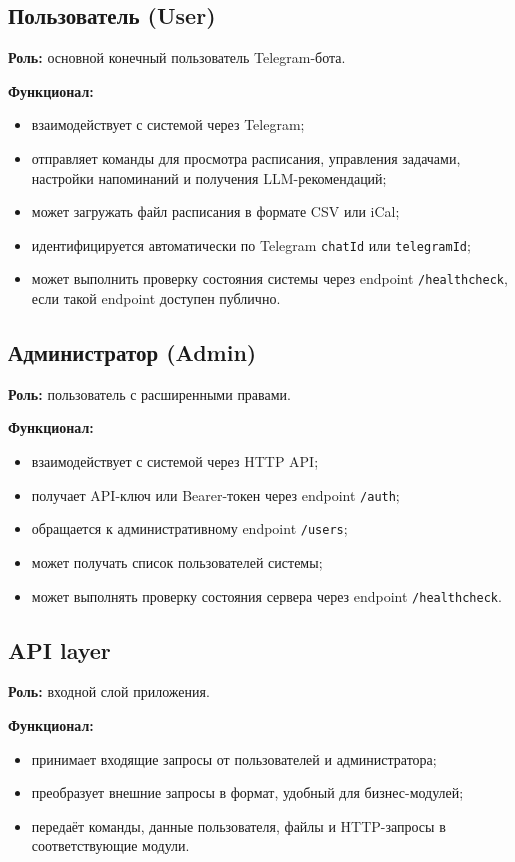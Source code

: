 \documentclass[10pt,a4paper,final]{article} %
\begin{document}
\subsection{Пользователь (User)}

\textbf{Роль:} основной конечный пользователь Telegram-бота.

\textbf{Функционал:}
\begin{itemize}
    \item взаимодействует с системой через Telegram;
    \item отправляет команды для просмотра расписания, управления задачами,
    настройки напоминаний и получения LLM-рекомендаций;
    \item может загружать файл расписания в формате CSV или iCal;
    \item идентифицируется автоматически по Telegram \texttt{chatId} или
    \texttt{telegramId};
    \item может выполнить проверку состояния системы через endpoint
    \texttt{/healthcheck}, если такой endpoint доступен публично.
\end{itemize}

\subsection{Администратор (Admin)}

\textbf{Роль:} пользователь с расширенными правами.

\textbf{Функционал:}
\begin{itemize}
    \item взаимодействует с системой через HTTP API;
    \item получает API-ключ или Bearer-токен через endpoint \texttt{/auth};
    \item обращается к административному endpoint \texttt{/users};
    \item может получать список пользователей системы;
    \item может выполнять проверку состояния сервера через endpoint
    \texttt{/healthcheck}.
\end{itemize}

\subsection{API layer}

\textbf{Роль:} входной слой приложения.

\textbf{Функционал:}
\begin{itemize}
    \item принимает входящие запросы от пользователей и администратора;
    \item преобразует внешние запросы в формат, удобный для бизнес-модулей;
    \item передаёт команды, данные пользователя, файлы и HTTP-запросы в
    соответствующие модули.
\end{itemize}
\end{document}
